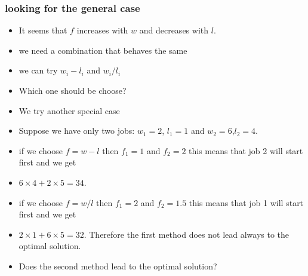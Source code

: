 \documentclass{beamer}
\begin{document}
\begin{frame}
  \frametitle{looking for the general case}
  \begin{itemize}
    \item It seems that $f$ increases with $w$ and decreases with $l$.
   \item we need a combination that behaves the same
  \item we can try $w_i-l_i$ and $w_i/l_i$
  \item Which one should be choose?
  \item We try another special case
  \item Suppose we have only two jobs: $w_1=2$, $l_1=1$ and $w_2=6$,$l_2=4$.
  \item if we choose $f=w-l$ then $f_1=1$ and $f_2=2$ this means that job 2 will start first and we get
  \item $6\times 4+2\times 5=34$.
  \item if we choose $f=w/l$ then $f_1=2$ and $f_2=1.5$ this means that job 1 will start first and we get
  \item $2\times 1+6\times 5=32$. Therefore the first method does not lead always to the optimal solution.
  \item Does the second method lead to the optimal solution?
  \end{itemize}
\end{frame}
\end{document}
